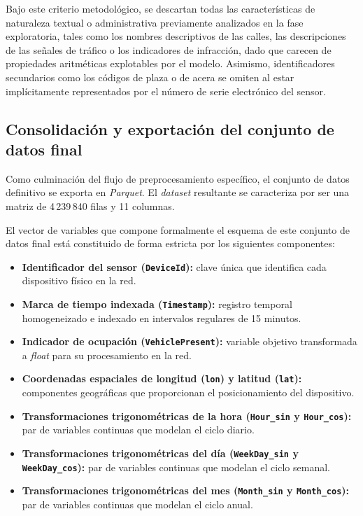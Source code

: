 Bajo este criterio metodológico, se descartan todas las características de naturaleza textual o administrativa previamente analizados en la fase exploratoria, tales como los nombres descriptivos de las calles, las descripciones de las señales de tráfico o los indicadores de infracción, dado que carecen de propiedades aritméticas explotables por el modelo. Asimismo, identificadores secundarios como los códigos de plaza o de acera se omiten al estar implícitamente representados por el número de serie electrónico del sensor.

\subsection{Consolidación y exportación del conjunto de datos final}
\label{subsec:exportacion_dataset}

Como culminación del flujo de preprocesamiento específico, el conjunto de datos definitivo se exporta en \textit{Parquet}. El \textit{dataset} resultante se caracteriza por ser una matriz de  4\,239\,840 filas y 11 columnas.

El vector de variables que compone formalmente el esquema de este conjunto de datos final está constituido de forma estricta por los siguientes componentes:

\begin{itemize}
	\item \textbf{Identificador del sensor (\texttt{DeviceId}):} clave única que identifica cada dispositivo físico en la red.
	\item \textbf{Marca de tiempo indexada (\texttt{Timestamp}):} registro temporal homogeneizado e indexado en intervalos regulares de 15 minutos.
	\item \textbf{Indicador de ocupación (\texttt{VehiclePresent}):} variable objetivo transformada a \textit{float} para su procesamiento en la red.
	\item \textbf{Coordenadas espaciales de longitud (\texttt{lon}) y latitud (\texttt{lat}):} componentes geográficas que proporcionan el posicionamiento del dispositivo.
	\item \textbf{Transformaciones trigonométricas de la hora (\texttt{Hour\_sin} y \texttt{Hour\_cos}):} par de variables continuas que modelan el ciclo diario.
	\item \textbf{Transformaciones trigonométricas del día (\texttt{WeekDay\_sin} y \texttt{WeekDay\_cos}):} par de variables continuas que modelan el ciclo semanal.
	\item \textbf{Transformaciones trigonométricas del mes (\texttt{Month\_sin} y \texttt{Month\_cos}):} par de variables continuas que modelan el ciclo anual.
\end{itemize}





